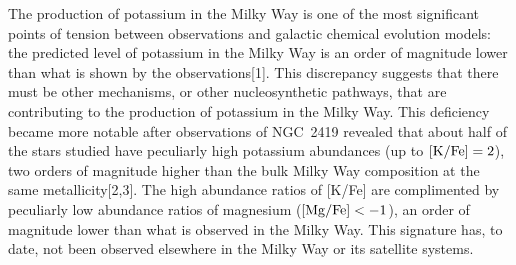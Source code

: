\documentclass[12pt]{report}
\begin{document}
The production of potassium in the Milky Way is one of the most significant points of tension between observations and galactic chemical evolution models: the predicted level of potassium in the Milky Way is an order of magnitude lower than what is shown by the observations[1]. This discrepancy suggests that there must be other mechanisms, or other nucleosynthetic pathways, that are contributing to the production of potassium in the Milky Way. This deficiency became more notable after observations of NGC~2419 revealed that about half of the stars studied have peculiarly high potassium abundances (up to $[{\rm K/Fe}] = 2$), two orders of magnitude higher than the bulk Milky Way composition at the same metallicity[2,3]. The high abundance ratios of [K/Fe] are complimented by peculiarly low abundance ratios of magnesium ($[{\rm Mg/Fe}] < -1$), an order of magnitude lower than what is observed in the Milky Way. This signature has, to date, not been observed elsewhere in the Milky Way or its satellite systems.%









\end{document}

